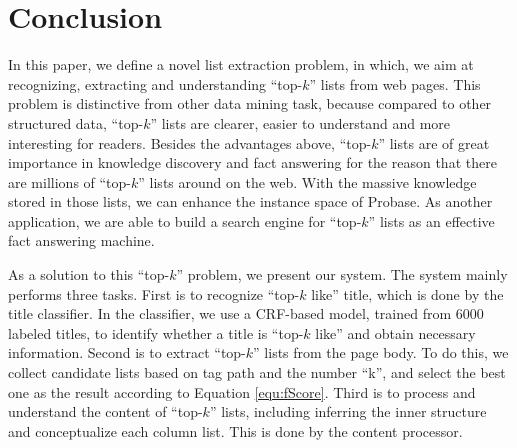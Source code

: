 \chapter{Conclusion}
\label{sec:conclusion}
%


In this paper, we define a novel list extraction problem,
in which, we aim at recognizing, extracting and understanding ``top-$k$'' lists from web pages.
This problem is distinctive from other data mining task, because compared to other structured data,
``top-$k$'' lists are clearer, easier to understand and more interesting for readers.
Besides the advantages above, ``top-$k$'' lists are of great importance in knowledge discovery and fact answering for the reason that there are millions of ``top-$k$'' lists around on the web. With the massive knowledge stored in those lists, we can enhance the instance space of Probase. As another application, we are able to build a search engine for ``top-$k$'' lists as an effective fact answering machine.

As a solution to this ``top-$k$'' problem, we present our system.
The system mainly performs three tasks. First is to recognize ``top-$k$ like'' title, which is done by the title classifier. In the classifier, we use a CRF-based model, trained from 6000 labeled titles, to identify whether a title is ``top-$k$ like'' and obtain necessary information.
Second is to extract ``top-$k$'' lists from the page body. To do this, we collect candidate lists based on tag path and the number ``k'', and select the best one as the result according to Equation \ref{equ:fScore}. Third is to process and understand the content of ``top-$k$'' lists, including inferring the inner structure and conceptualize each column list. This is done by the content processor.


